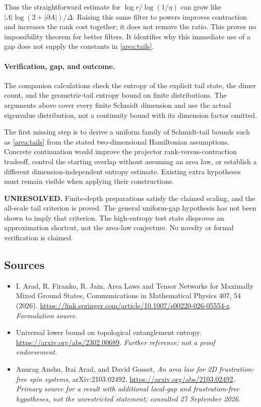 \documentclass[11pt]{article}
\begin{document}
Thus the straightforward estimate for
$\log r/\log(1/\eta)$ can grow like
$|\Lambda|\log(2+|\partial A|)/\Delta$. Raising this same filter
to powers improves contraction and increases the rank cost together;
it does not remove the ratio. This proves no impossibility theorem
for better filters. It identifies why this immediate use of a gap
does not supply the constants in \eqref{area:tails}.

\paragraph{Verification, gap, and outcome.}
The companion calculations check the entropy of the explicit tail
state, the dimer count, and the geometric-tail entropy bound on
finite distributions. The arguments above cover every finite
Schmidt dimension and use the actual eigenvalue distribution, not
a continuity bound with its dimension factor omitted.

The first missing step is to derive a uniform family of Schmidt-tail
bounds such as \eqref{area:tails} from the stated two-dimensional
Hamiltonian assumptions. Concrete continuation would improve the
projector rank-versus-contraction tradeoff, control the starting
overlap without assuming an area law, or establish a different
dimension-independent entropy estimate. Existing extra hypotheses
must remain visible when applying their constructions.

\textbf{UNRESOLVED.} Finite-depth preparations satisfy the claimed
scaling, and the all-scale tail criterion is proved. The general
uniform-gap hypothesis has not been shown to imply that criterion.
The high-entropy test state disproves an approximation shortcut,
not the area-law conjecture. No novelty or formal verification is claimed.

\subsection{Sources}
\begin{itemize}
\item[S1]I. Arad, R. Firanko, R. Jain, Area Laws and Tensor Networks for Maximally Mixed Ground States, Communications in Mathematical Physics 407, 54 (2026).
\url{https://link.springer.com/article/10.1007/s00220-026-05554-z}.
\textit{Formulation source.}
\item[S2]Universal lower bound on topological entanglement entropy.
\url{https://arxiv.org/abs/2302.00689}.
\textit{Further reference; not a proof endorsement.}
\item[E1]Anurag Anshu, Itai Arad, and David Gosset, \emph{An area law for 2D frustration-free spin systems}, arXiv:2103.02492.
\url{https://arxiv.org/abs/2103.02492}.
\textit{Primary source for a result with additional local-gap and frustration-free hypotheses, not the unrestricted statement; consulted 27 September 2026.}
\end{itemize}
\end{document}

